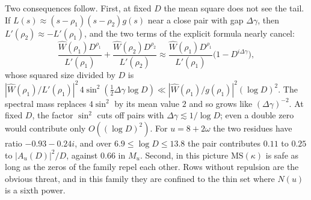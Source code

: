 \documentclass[11pt]{article}
\theoremstyle{remark}
\begin{document}
Two consequences follow. First, at fixed $D$ the mean square does not see the tail. If
$L(s)\approx(s-\rho_1)(s-\rho_2)g(s)$ near a close pair with gap $\Delta\gamma$, then
$L'(\rho_2)\approx-L'(\rho_1)$, and the two terms of the explicit formula nearly cancel:
\[
\frac{\widehat W(\rho_1)D^{\rho_1}}{L'(\rho_1)}+\frac{\widehat W(\rho_2)D^{\rho_2}}{L'(\rho_2)}
\approx\frac{\widehat W(\rho_1)D^{\rho_1}}{L'(\rho_1)}\big(1-D^{i\Delta\gamma}\big),
\]
whose squared size divided by $D$ is $|\widehat W(\rho_1)/L'(\rho_1)|^2\,4\sin^2(\frac12\Delta\gamma\log D)
\ll|\widehat W(\rho_1)/g(\rho_1)|^2(\log D)^2$. The spectral mass replaces $4\sin^2$ by its mean value
$2$ and so grows like $(\Delta\gamma)^{-2}$. At fixed $D$, the factor $\sin^2$ cuts off pairs with
$\Delta\gamma\lesssim1/\log D$; even a double zero would contribute only $O((\log D)^2)$. For
$u=8+2\omega$ the two residues have ratio $-0.93-0.24i$, and over $6.9\le\log D\le13.8$ the pair
contributes $0.11$ to $0.25$ to $|A_u(D)|^2/D$, against $0.66$ in $M_u$. Second, in this picture
$\mathrm{MS}(\kappa)$ is safe as long as the zeros of the family repel each other. Rows without
repulsion are the obvious threat, and in this family they are confined to the thin set
where $N(u)$ is a sixth power.
\end{document}
